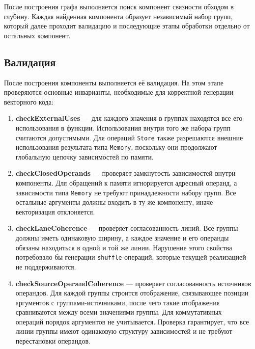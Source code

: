 После построения графа выполняется поиск компонент связности обходом в глубину.
Каждая найденная компонента образует независимый набор групп, который далее проходит валидацию и последующие этапы обработки отдельно от остальных компонент.

\subsection{Валидация}
\label{sec:validation2}

После построения компоненты выполняется её валидация. 
На этом этапе проверяются основные инварианты, необходимые для корректной генерации векторного кода:

\begin{enumerate}
    \item \textbf{checkExternalUses} --- для каждого значения в группах находятся все его использования в функции. 
    Использования внутри того же набора групп считаются допустимыми.
    Для операций \texttt{Store} также разрешаются внешние использования результата типа \texttt{Memory}, поскольку они продолжают глобальную цепочку зависимостей по памяти. 

    \item \textbf{checkClosedOperands} --- проверяет замкнутость зависимостей внутри компоненты. 
    Для обращений к памяти игнорируется адресный операнд, а зависимости типа \texttt{Memory} не требуют принадлежности набору групп. 
    Все остальные аргументы должны входить в ту же компоненту, иначе векторизация отклоняется.

    \item \textbf{checkLaneCoherence} --- проверяет согласованность линий. 
    Все группы должны иметь одинаковую ширину, а каждое значение и его операнды обязаны находиться в одной и той же линии. 
    Нарушение этого свойства потребовало бы генерации \texttt{shuffle}-операций, которые текущей реализацией не поддерживаются.

    \item \textbf{checkSourceOperandCoherence} --- проверяет согласованность источников операндов. 
    Для каждой группы строится отображение, связывающее позиции аргументов с группами-источниками, после чего такие отображения сравниваются между всеми значениями группы. 
    Для коммутативных операций порядок аргументов не учитывается. 
    Проверка гарантирует, что все линии группы имеют одинаковую структуру зависимостей и не требуют перестановки операндов.
\end{enumerate}


